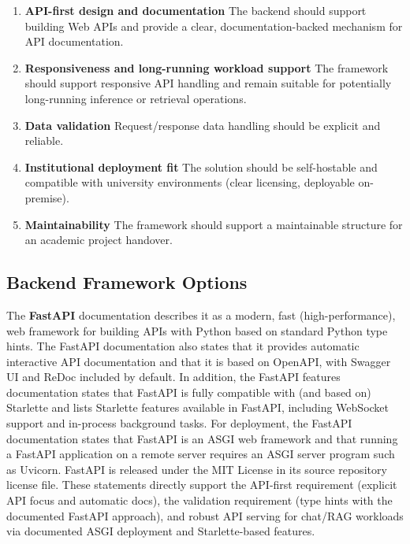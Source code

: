 \begin{enumerate}
    \item \textbf{API-first design and documentation}
    The backend should support building Web APIs and provide a clear, documentation-backed mechanism for API documentation.
    \item \textbf{Responsiveness and long-running workload support}
    The framework should support responsive API handling and remain suitable for potentially long-running inference or retrieval operations.
    \item \textbf{Data validation}
    Request/response data handling should be explicit and reliable.
    \item \textbf{Institutional deployment fit}
    The solution should be self-hostable and compatible with university environments (clear licensing, deployable on-premise).
    \item \textbf{Maintainability}
    The framework should support a maintainable structure for an academic project handover.
\end{enumerate}



\subsection{Backend Framework Options}

The \textbf{FastAPI} documentation describes it as a modern, fast (high-performance), web framework for building APIs with Python based on standard Python type hints. \parencite{FastAPIHome:online} The FastAPI documentation also states that it provides automatic interactive API documentation and that it is based on OpenAPI, with Swagger UI and ReDoc included by default. \parencite{FastAPIFeaturesDocs:online} In addition, the FastAPI features documentation states that FastAPI is fully compatible with (and based on) Starlette and lists Starlette features available in FastAPI, including WebSocket support and in-process background tasks. \parencite{FastAPIFeaturesStarlette:online} For deployment, the FastAPI documentation states that FastAPI is an ASGI web framework and that running a FastAPI application on a remote server requires an ASGI server program such as Uvicorn. \parencite{FastAPIDeployASGI:online} FastAPI is released under the MIT License in its source repository license file. \parencite{FastAPILicense:online} These statements directly support the API-first requirement (explicit API focus and automatic docs), the validation requirement (type hints with the documented FastAPI approach), and robust API serving for chat/RAG workloads via documented ASGI deployment and Starlette-based features.


